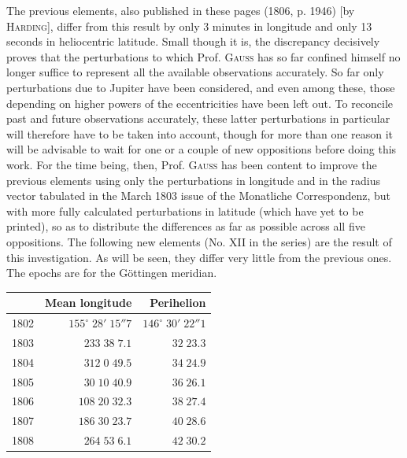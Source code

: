 \par\indent The previous elements, also published in these pages (1806, p. 1946) [by \textsc{Harding}], differ from this result by only 3 minutes in longitude and only 13 seconds in heliocentric latitude. Small though it is, the discrepancy decisively proves that the perturbations to which Prof. \textsc{Gauss} has so far confined himself no longer suffice to represent all the available observations accurately. So far only perturbations due to Jupiter have been considered, and even among these, those depending on higher powers of the eccentricities have been left out. To reconcile past and future observations accurately, these latter perturbations in particular will therefore have to be taken into account, though for more than one reason it will be advisable to wait for one or a couple of new oppositions before doing this work. For the time being, then, Prof. \textsc{Gauss} has been content to improve the previous elements using only the perturbations in longitude and in the radius vector tabulated in the March 1803 issue of the Monatliche Correspondenz, but with more fully calculated perturbations in latitude (which have yet to be printed), so as to distribute the differences as far as possible across all five oppositions. The following new elements (No. XII in the series) are the result of this investigation. As will be seen, they differ very little from the previous ones. The epochs are for the Göttingen meridian.

\begin{center}\fontsize{10}{12}\selectfont\setlength{\tabcolsep}{3pt}\renewcommand{\arraystretch}{1.15}\begin{tabular}{lrr}
& Mean longitude & Perihelion\\\hline
1802 & $155^\circ\;28'\;15''7$ & $146^\circ\;30'\;22''1$\\
1803 & $233\;38\;7.1$ & $32\;23.3$\\
1804 & $312\;0\;49.5$ & $34\;24.9$\\
1805 & $30\;10\;40.9$ & $36\;26.1$\\
1806 & $108\;20\;32.3$ & $38\;27.4$\\
1807 & $186\;30\;23.7$ & $40\;28.6$\\
1808 & $264\;53\;6.1$ & $42\;30.2$\\
\end{tabular}\end{center}

